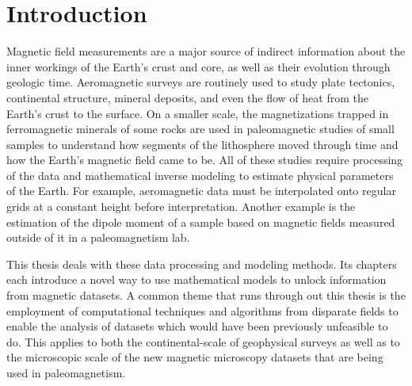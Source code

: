 \documentclass[10pt,a4paper,oneside]{book}
\begin{document}
%

\tableofcontents

\mainmatter
\pagestyle{fancy}

\chapter{Introduction}

Magnetic field measurements are a major source of indirect information about
the inner workings of the Earth's crust and core, as well as their evolution
through geologic time.
Aeromagnetic surveys are routinely used to study plate tectonics, continental
structure, mineral deposits, and even the flow of heat from the Earth's crust
to the surface.
On a smaller scale, the magnetizations trapped in ferromagnetic minerals of
some rocks are used in paleomagnetic studies of small samples to understand how
segments of the lithosphere moved through time and how the Earth's magnetic
field came to be.
All of these studies require processing of the data and mathematical inverse
modeling to estimate physical parameters of the Earth.
For example, aeromagnetic data must be interpolated onto regular grids at
a constant height before interpretation.
Another example is the estimation of the dipole moment of a sample based on
magnetic fields measured outside of it in a paleomagnetism lab.

This thesis deals with these data processing and modeling methods.
Its chapters each introduce a novel way to use mathematical models to unlock
information from magnetic datasets.
A common theme that runs through out this thesis is the employment of
computational techniques and algorithms from disparate fields to enable
the analysis of datasets which would have been previously unfeasible to do.
This applies to both the continental-scale of geophysical surveys as well as
to the microscopic scale of the new magnetic microscopy datasets that are being
used in paleomagnetism.
\end{document}
